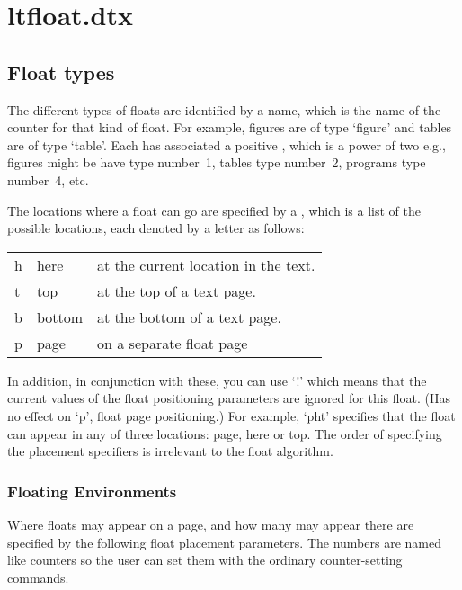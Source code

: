 \chapter{ltfloat.dtx}

 \section{Float types}

  The different types of floats are identified by a  name,
  which is the name of the counter for that kind of float.  For
  example, figures are of type `figure' and tables are of type `table'.
  Each  has associated a positive , which
  is a power of two e.g.,\\
  figures might be have type number~1, tables type number~2, programs
  type number~4, etc.

  The locations where a float can go are specified by a
  , which is a list of the possible
  locations, each denoted by a letter as follows:

    \begin{center}
    \begin{tabular}{l@{ : }l@{ --- }l}
     h & here   & at the current location in the text.\\
     t & top    & at the top of a text page.\\
     b & bottom & at the bottom of a text page.\\
     p & page   & on a separate float page
    \end{tabular}
    \end{center}

  In addition, in conjunction with these, you can use `!' which means
  that the current values of the float positioning parameters are
  ignored for this float. (Has no effect on `p', float page
  positioning.)
  For example, `pht' specifies that the float can appear in any of
  three locations: page, here or top. The order of specifying the placement
  specifiers is irrelevant to the float algorithm.


\subsection{Floating Environments}
    \begin{teX}
    \end{teX}



 Where floats may appear on a page, and how many may appear there
 are specified by the following float placement parameters.  The
 numbers are named like counters so the user can set them with
 the ordinary counter-setting commands.

